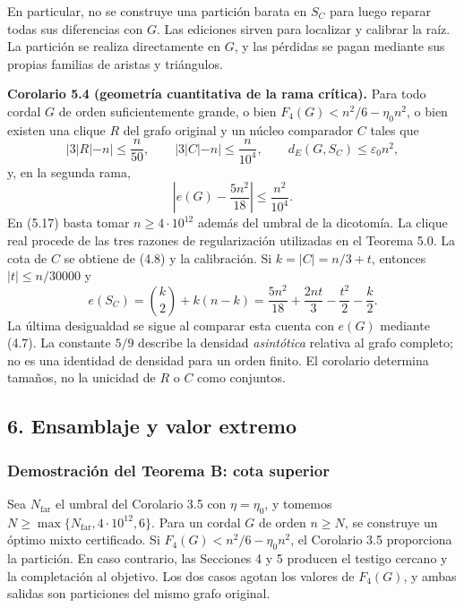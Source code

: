 \documentclass[spanish,11pt,a4paper]{article}
\begin{document}
En particular, no se construye una partición barata en \(S_C\) para luego reparar todas sus diferencias con \(G\). Las ediciones sirven para localizar y calibrar la raíz. La partición se realiza directamente en \(G\), y las pérdidas se pagan mediante sus propias familias de aristas y triángulos.


\textbf{Corolario 5.4 (geometría cuantitativa de la rama crítica).} Para todo cordal \(G\) de orden suficientemente grande, o bien \(F_4(G)<n^2/6-\eta_0n^2\), o bien existen una clique \(R\) del grafo original y un núcleo comparador \(C\) tales que \[
|3|R|-n|\le\frac n{50},\qquad
|3|C|-n|\le\frac n{10^4},\qquad
d_E(G,S_C)\le\varepsilon_0n^2,
\tag{5.17}
\] y, en la segunda rama, \[
\left|e(G)-\frac{5n^2}{18}\right|\le\frac{n^2}{10^4}.
\tag{5.18}
\] En (5.17) basta tomar \(n\ge4\cdot10^{12}\) además del umbral de la dicotomía. La clique real procede de las tres razones de regularización utilizadas en el Teorema 5.0. La cota de \(C\) se obtiene de (4.8) y la calibración. Si \(k=|C|=n/3+t\), entonces \(|t|\le n/30000\) y \[
e(S_C)=\binom k2+k(n-k)
=\frac{5n^2}{18}+\frac{2nt}{3}-\frac{t^2}{2}-\frac{k}{2}.
\] La última desigualdad se sigue al comparar esta cuenta con \(e(G)\) mediante (4.7). La constante \(5/9\) describe la densidad \emph{asintótica} relativa al grafo completo; no es una identidad de densidad para un orden finito. El corolario determina tamaños, no la unicidad de \(R\) o \(C\) como conjuntos.

\subsection{6. Ensamblaje y valor extremo}\label{ensamblaje-y-valor-extremo}

\subsubsection{Demostración del Teorema B: cota superior}\label{demostracion-del-teorema-b-cota-superior}

Sea \(N_{\mathrm{far}}\) el umbral del Corolario 3.5 con \(\eta=\eta_0\), y tomemos \(N\ge\max\{N_{\mathrm{far}},4\cdot10^{12},6\}\). Para un cordal \(G\) de orden \(n\ge N\), se construye un óptimo mixto certificado. Si \(F_4(G)<n^2/6-\eta_0n^2\), el Corolario 3.5 proporciona la partición. En caso contrario, las Secciones 4 y 5 producen el testigo cercano y la completación al objetivo. Los dos casos agotan los valores de \(F_4(G)\), y ambas salidas son particiones del mismo grafo original.
\end{document}
